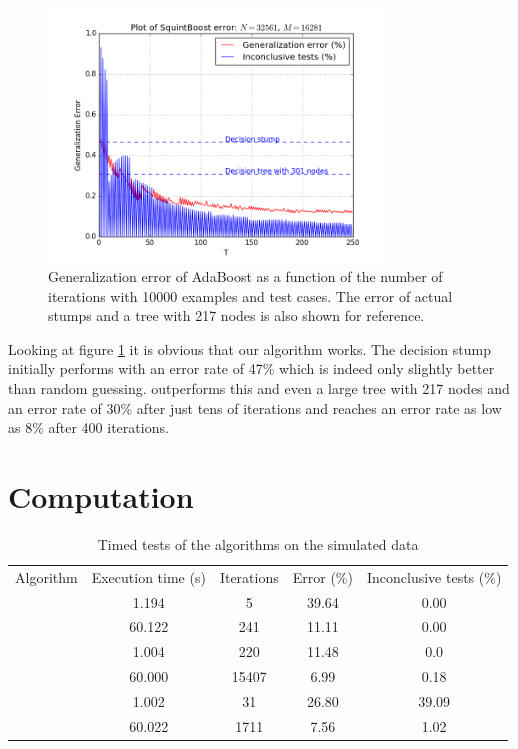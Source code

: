 \begin{figure}[!ht]
  \centering
      \includegraphics[width=0.8\textwidth]{generated/SQGD.png}
  \caption{Generalization error of AdaBoost as a function of the number of iterations with 10000 examples and test cases. The error of actual stumps and a tree with 217 nodes is also shown for reference.}
      \label{fig:adaB}
\end{figure}

\par Looking at figure \ref{fig:adaB} it is obvious that our algorithm works. The decision stump initially performs with an error rate of 47\% which is indeed only slightly better than random guessing. \adaB outperforms this and even a large tree with 217 nodes and an error rate of 30\% after just tens of iterations and reaches an error rate as low as 8\% after 400 iterations. 

 \subsection{\NHB}
 \label{subsec:NHPracPerf}
\newpage
\section{Computation}
\begin{table}[htbp]
\centering
\begin{tabular}{|c|c|c|c|c|}
\hline
Algorithm & Execution time (s) & Iterations & Error (\%) & Inconclusive tests (\%)  \\ \hhline{|=|=|=|=|=|}
\multirow{ 2}{*}{\adaB} & 1.194 & 5 & 39.64 & 0.00  \\\cline{2-5}
& 60.122 & 241 &  11.11 & 0.00  \\ \Xhline{1pt}
\multirow{ 2}{*}{\adaN} & 1.004 & 220 & 11.48  & 0.0 \\\cline{2-5}
& 60.000 & 15407 &  6.99 & 0.18  \\ \Xhline{1pt}
\multirow{ 2}{*}{\squintB} & 1.002 & 31 & 26.80  & 39.09\\\cline{2-5}
 & 60.022 & 1711 &  7.56  &  1.02\\ \hline
\end{tabular}
\caption{Timed tests of the algorithms on the simulated data}
\label{tbl:GDTime}
\end{table}

